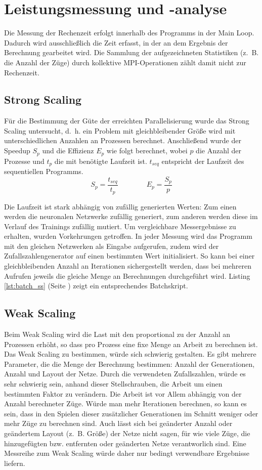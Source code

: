 \section{Leistungsmessung und -analyse}

Die Messung der Rechenzeit erfolgt innerhalb des Programms in der Main Loop.
Dadurch wird ausschließlich die Zeit erfasst, in der an dem Ergebnis der
Berechnung gearbeitet wird.  Die Sammlung der aufgezeichneten Statistiken
(z.~B. die Anzahl der Züge) durch kollektive MPI-Operationen zählt damit nicht
zur Rechenzeit.

\subsection{Strong Scaling}
Für die Bestimmung der Güte der erreichten Parallelisierung wurde das Strong
Scaling untersucht, d.~h. ein Problem mit gleichbleibender Größe wird mit
unterschiedlichen Anzahlen an Prozessen berechnet. Anschließend wurde der
Speedup $S_p$ und die Effizienz  $E_p$ wie folgt berechnet, wobei $p$ die
Anzahl der Prozesse und $t_p$ die mit benötigte Laufzeit ist. $t_{seq}$
entspricht der Laufzeit des sequentiellen Programms.
\begin{equation*}
    S_p = \frac{t_{seq}}{t_p} \qquad\qquad E_p = \frac{S_p}{p}
\end{equation*}

Die Laufzeit ist stark abhängig von zufällig generierten Werten: Zum einen
werden die neuronalen Netzwerke zufällig generiert, zum anderen werden diese im
Verlauf des Trainings zufällig mutiert.  Um vergleichbare Messergebnisse zu
erhalten, wurden Vorkehrungen getroffen.  In jeder Messung wird das Programm
mit den gleichen Netzwerken als Eingabe aufgerufen, zudem wird der
Zufallszahlengenerator auf einen bestimmten Wert initialisiert. So kann bei
einer gleichbleibenden Anzahl an Iterationen sichergestellt werden, dass bei
mehreren Aufrufen jeweils die gleiche Menge an Berechnungen durchgeführt wird.
Listing \ref{lst:batch_ss} (Seite \pageref{lst:batch_ss}) zeigt ein
entsprechendes Batchskript.

\subsection{Weak Scaling}
Beim Weak Scaling wird die Last mit den proportional zu der Anzahl an Prozessen
erhöht, so dass pro Prozess eine fixe Menge an Arbeit zu berechnen ist.  Das
Weak Scaling zu bestimmen, würde sich schwierig gestalten. Es gibt mehrere
Parameter, die die Menge der Berechnung bestimmen: Anzahl der Generationen,
Anzahl und Layout der Netze. Durch die verwendeten Zufallszahlen, würde es sehr
schwierig sein, anhand dieser Stellschrauben, die Arbeit um einen bestimmten
Faktor zu verändern. Die Arbeit ist vor Allem abhängig von der Anzahl
berechneter Züge.  Würde man mehr Iterationen berechnen, so kann es sein, dass
in den Spielen dieser zusätzlicher Generationen im Schnitt weniger oder mehr
Züge zu berechnen sind. Auch lässt sich bei geänderter Anzahl oder geändertem
Layout (z.~B. Größe) der Netze nicht sagen, für wie viele Züge, die
hinzugefügten bzw. entfernten oder geänderten Netze verantworlich sind.  Eine
Messreihe zum Weak Scaling würde daher nur bedingt verwendbare Ergebnisse
liefern.
